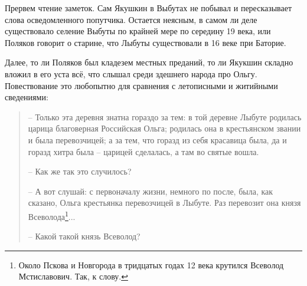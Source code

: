 Прервем чтение заметок. Сам Якушкин в Выбутах не побывал и пересказывает слова осведомленного попутчика. Остается неясным, в самом ли деле существовало селение Выбуты по крайней мере по середину 19 века, или Поляков говорит о старине, что Лыбуты существовали в 16 веке при Баторие.

Далее, то ли Поляков был кладезем местных преданий, то ли Якукшин складно вложил в его уста всё, что слышал среди здешнего народа про Ольгу. Повествование это любопытно для сравнения с летописными и житийными сведениями:

\begin{quotation}
   – Только эта деревня знатна гораздо за тем: в той деревне Лыбуте родилась царица благоверная Российская Ольга; родилась она в крестьянском звании и была перевозчицей; а за тем, что горазд из себя красавица была, да и горазд хитра была – царицей сделалась, а там во святые вошла.

   – Как же так это случилось?

   – А вот слушай: с первоначалу жизни, немного по после, была, как сказано, Ольга крестьянка перевозчицей в Лыбуте. Раз перевозит она князя Всеволода\footnote{Около Пскова и Новгорода в тридцатых годах 12 века крутился Всеволод Мстиславович. Так, к слову.}...

   – Какой такой князь Всеволод?


\end{quotation}

